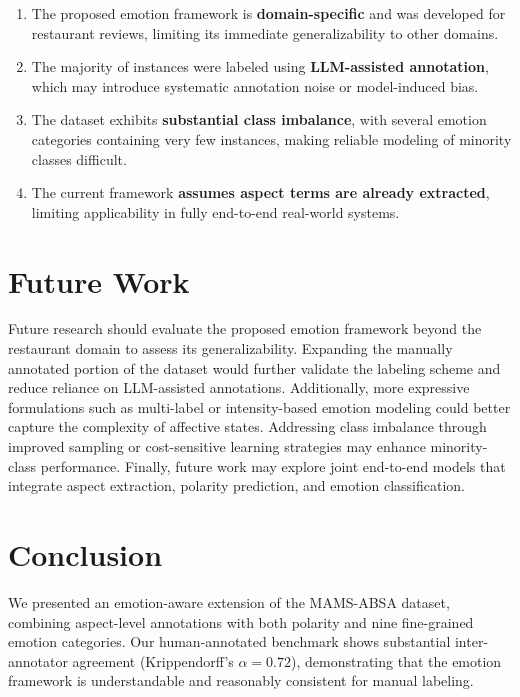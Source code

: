 \documentclass[10pt]{article}
\begin{document}
\begin{enumerate}[leftmargin=*, itemsep=4pt]
  \item The proposed emotion framework is \textbf{domain-specific} and was developed for restaurant reviews, limiting its immediate generalizability to other domains.
  \item The majority of instances were labeled using \textbf{LLM-assisted annotation}, which may introduce systematic annotation noise or model-induced bias.
  \item The dataset exhibits \textbf{substantial class imbalance}, with several emotion categories containing very few instances, making reliable modeling of minority classes difficult.
  \item The current framework \textbf{assumes aspect terms are already extracted}, limiting applicability in fully end-to-end real-world systems.
\end{enumerate}

\section{Future Work}

Future research should evaluate the proposed emotion framework beyond the restaurant domain to assess its generalizability. Expanding the manually annotated portion of the dataset would further validate the labeling scheme and reduce reliance on LLM-assisted annotations. Additionally, more expressive formulations such as multi-label or intensity-based emotion modeling could better capture the complexity of affective states. Addressing class imbalance through improved sampling or cost-sensitive learning strategies may enhance minority-class performance. Finally, future work may explore joint end-to-end models that integrate aspect extraction, polarity prediction, and emotion classification.

\section{Conclusion}

We presented an emotion-aware extension of the MAMS-ABSA dataset, combining aspect-level annotations with both polarity and nine fine-grained emotion categories. Our human-annotated benchmark shows substantial inter-annotator agreement (Krippendorff's $\alpha = 0.72$), demonstrating that the emotion framework is understandable and reasonably consistent for manual labeling.
\end{document}

